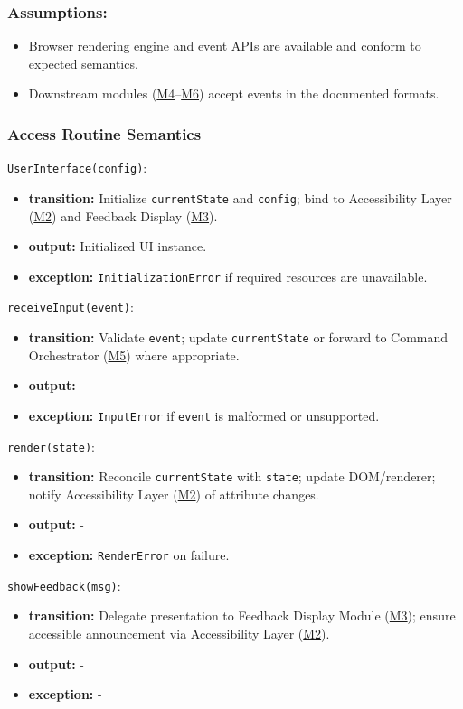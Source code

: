\documentclass[12pt, titlepage]{article}
\begin{document}
\subsubsection{Assumptions:}
\begin{itemize}
  \item Browser rendering engine and event APIs are available and conform to expected semantics.
  \item Downstream modules (\hyperref[M4]{M4}--\hyperref[M6]{M6}) accept events in the documented formats.
\end{itemize}
\subsubsection{Access Routine Semantics}

\noindent\texttt{UserInterface(config)}:
\begin{itemize}
\item \textbf{transition:} Initialize \texttt{currentState} and \texttt{config}; bind to Accessibility Layer (\hyperref[M2]{M2}) and Feedback Display (\hyperref[M3]{M3}).
\item \textbf{output:} Initialized UI instance.
\item \textbf{exception:} \texttt{InitializationError} if required resources are unavailable.
\end{itemize}

\noindent\texttt{receiveInput(event)}:
\begin{itemize}
\item \textbf{transition:} Validate \texttt{event}; update \texttt{currentState} or forward to Command Orchestrator (\hyperref[M5]{M5}) where appropriate.
\item \textbf{output:} -
\item \textbf{exception:} \texttt{InputError} if \texttt{event} is malformed or unsupported.
\end{itemize}

\noindent\texttt{render(state)}:
\begin{itemize}
\item \textbf{transition:} Reconcile \texttt{currentState} with \texttt{state}; update DOM/renderer; notify Accessibility Layer (\hyperref[M2]{M2}) of attribute changes.
\item \textbf{output:} -
\item \textbf{exception:} \texttt{RenderError} on failure.
\end{itemize}

\noindent\texttt{showFeedback(msg)}:
\begin{itemize}
  \item \textbf{transition:} Delegate presentation to Feedback Display Module (\hyperref[M3]{M3}); ensure accessible announcement via Accessibility Layer (\hyperref[M2]{M2}).
  \item \textbf{output:} -
  \item \textbf{exception:} -
\end{itemize}
\end{document}
